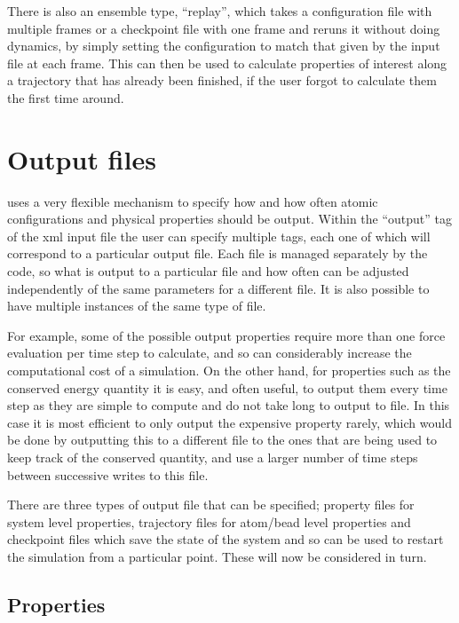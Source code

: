\documentclass[11pt,english,fleqn]{report}
\begin{document}
There is also an ensemble type, {}``replay'', which takes a configuration
file with multiple frames or a checkpoint file with one frame and
reruns it without doing dynamics, by simply setting the configuration
to match that given by the input file at each frame. This can then
be used to calculate properties of interest along a trajectory that
has already been finished, if the user forgot to calculate them the
first time around.


\section{Output files}

\label{outputfiles}


\ipi uses a very flexible mechanism to specify how and how often
atomic configurations and physical properties should be output. Within
the {}``output'' tag of the xml input file the user can specify
multiple tags, each one of which will correspond to a particular output
file. Each file is managed separately by the code, so what is output
to a particular file and how often can be adjusted independently of
the same parameters for a different file. It is also possible to have
multiple instances of the same type of file.

For example, some of the possible output properties require more than
one force evaluation per time step to calculate, and so can considerably
increase the computational cost of a simulation. On the other hand,
for properties such as the conserved energy quantity it is easy, and
often useful, to output them every time step as they are simple to
compute and do not take long to output to file. In this case it is
most efficient to only output the expensive property rarely, which
would be done by outputting this to a different file to the ones that
are being used to keep track of the conserved quantity, and use a
larger number of time steps between successive writes to this file.

There are three types of output file that can be specified; property
files for system level properties, trajectory files for atom/bead
level properties and checkpoint files which save the state of the
system and so can be used to restart the simulation from a particular
point. These will now be considered in turn.


\subsection{Properties}
\end{document}

